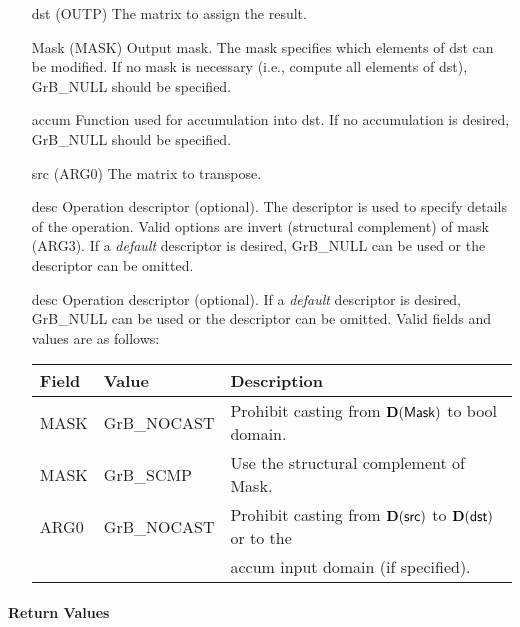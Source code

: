 \begin{itemize}[leftmargin=1.1in]
    \item[{\sf dst}]   ({\sf OUTP}) The matrix to assign the result.

    \item[{\sf Mask}]  ({\sf MASK}) Output mask. The mask specifies which elements
    of {\sf dst} can be modified. If no mask is necessary (i.e., compute all
    elements of {\sf dst}), {\sf GrB\_NULL} should be specified.

    \item[{\sf accum}] Function used for accumulation into {\sf dst}.  If no accumulation
                        is desired, {\sf GrB\_NULL} should be specified.

    \item[{\sf src}]   ({\sf ARG0}) The matrix to transpose.

    \item[{\sf desc}]  Operation descriptor (optional). The descriptor
    is used to specify details of the operation. Valid options are 
    invert (structural complement) of mask ({\sf ARG3}). If
    a \emph{default} descriptor is desired,    {\sf GrB\_NULL} can be
    used or the descriptor can be omitted.

    \item[{\sf desc}]   Operation descriptor (optional). If a
    \emph{default} descriptor is desired, {\sf GrB\_NULL} can be
    used or the descriptor can be omitted.  Valid fields and values are as follows: \\
    \begin{tabular}{lll}
    Field  & Value & Description \\
    \hline
    {\sf MASK} & {\sf GrB\_NOCAST} & Prohibit casting from $\bold{D}({\sf Mask})$ to {\sf bool} domain. \\
    {\sf MASK} & {\sf GrB\_SCMP}   & Use the structural complement of {\sf Mask}. \\
    {\sf ARG0} & {\sf GrB\_NOCAST} & Prohibit casting from $\bold{D}({\sf src})$ to $\bold{D}({\sf dst})$ or to the \\ & & accum input domain (if specified). \\
    \end{tabular}
\end{itemize}

\paragraph{Return Values}

